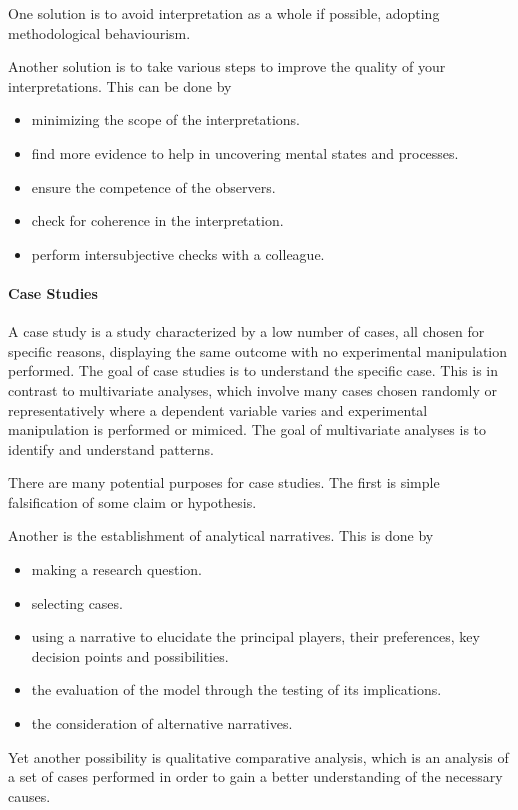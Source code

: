One solution is to avoid interpretation as a whole if possible, adopting methodological behaviourism.

Another solution is to take various steps to improve the quality of your interpretations. This can be done by
\begin{itemize}
	\item minimizing the scope of the interpretations.
	\item find more evidence to help in uncovering mental states and processes.
	\item ensure the competence of the observers.
	\item check for coherence in the interpretation.
	\item perform intersubjective checks with a colleague.
\end{itemize}

\paragraph{Case Studies}
A case study is a study characterized by a low number of cases, all chosen for specific reasons, displaying the same outcome with no experimental manipulation performed. The goal of case studies is to understand the specific case. This is in contrast to multivariate analyses, which involve many cases chosen randomly or representatively where a dependent variable varies and experimental manipulation is performed or mimiced. The goal of multivariate analyses is to identify and understand patterns.

There are many potential purposes for case studies. The first is simple falsification of some claim or hypothesis.

Another is the establishment of analytical narratives. This is done by
\begin{itemize}
	\item making a research question.
	\item selecting cases.
	\item using a narrative to elucidate the principal players, their preferences, key decision points and possibilities.
	\item the evaluation of the model through the testing of its implications.
	\item the consideration of alternative narratives.
\end{itemize}

Yet another possibility is qualitative comparative analysis, which is an analysis of a set of cases performed in order to gain a better understanding of the necessary causes.

